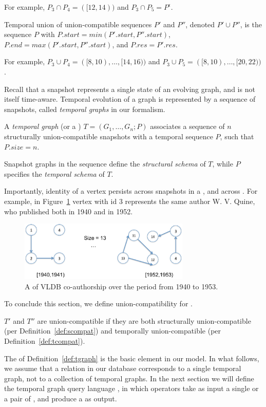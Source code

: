 For example, $P_3 \cap P_4 = ([12,14))$ and $P_3 \cap P_5 =
  P^{\epsilon}$.

\begin{definition} 
\label{def:tseqor}
Temporal union of union-compatible sequences $P'$ and $P''$, denoted
$P' \cup P''$, is the sequence $P$ with $P.start = min(P'.start,
P''.start)$, $P.end = max(P'.start, P''.start)$, and $P.res = P'.res$.
\end{definition}

For example, $P_3 \cup P_4 = ([8,10),\ldots,[14,16))$ and
$P_3 \cup P_5 = ([8,10), \ldots, [20,22))$.

Recall that a snapshot represents a single state of an evolving graph,
and is not itself time-aware.  Temporal evolution of a graph is
represented by a sequence of snapshots, called {\em temporal graphs}
in our formalism.

\begin{definition} 
\label{def:tgraph} 
A {\em temporal graph} (or a {\em \tg}) $T = (G_1, \ldots, G_n; P)$
  associates a sequence of $n$ structurally union-compatible snapshots
  with a temporal sequence $P$, such that $P.size = n$.
\end{definition}

Snapshot graphs in the sequence define the {\em structural schema} of
$T$, while $P$ specifies the {\em temporal schema} of $T$.

Importantly, identity of a vertex persists across snapshots in a
\tg, and across \tgs.  For example, in Figure~\ref{fig:tgraph}
vertex with id 3 represents the same author W. V. Quine, who published
both in 1940 and in 1952.

\begin{figure}
\label{fig:tgraph}
\includegraphics[width=3.2in]{figs/temporalgraph.pdf}
\caption{A \tg of VLDB co-authorship over the period from 1940 to 1953.}
\end{figure}

To conclude this section, we define union-compatibility for \tgs.

\begin{definition} 
\label{def:tuc} \tgs $T'$ and $T''$ are union-compatible if they are both
structurally union-compatible (per Definition~\ref{def:scompat}) and
temporally union-compatible (per Definition~\ref{def:tcompat}).
\end{definition}

The \tg of Definition~\ref{def:tgraph} is the basic element in our
model.  In what follows, we assume that a relation in our database
corresponds to a single temporal graph, not to a collection of
temporal graphs.  In the next section we will define the temporal
graph query language \ql, in which operators take as input a single
\tg or a pair of \tgs, and produce a \tg as output.




